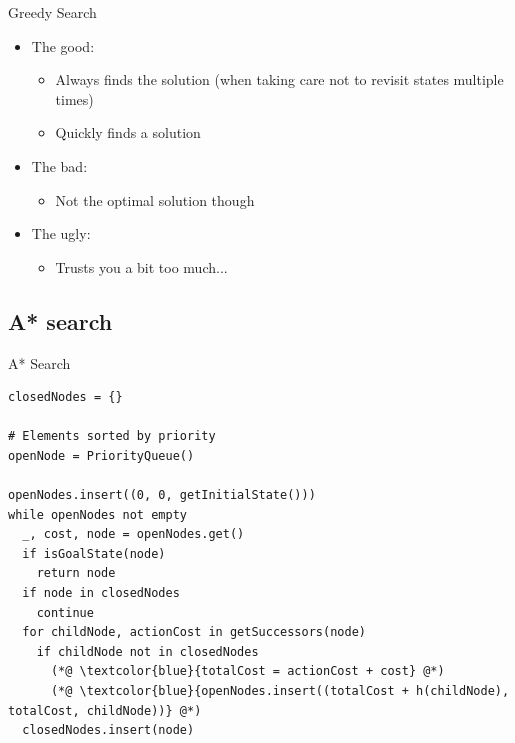 \documentclass{beamer}
\begin{document}
\begin{frame}{Greedy Search}
	\begin{itemize}
		\item The good:
			\pause
			\begin{itemize}
				\item Always finds the solution (when taking care not to revisit states multiple times)
				\item Quickly finds a solution
			\end{itemize}
		\pause
		\item The bad:
			\pause
			\begin{itemize}
				\item Not the optimal solution though
			\end{itemize}
		\pause
		\item The ugly:
			\pause
			\begin{itemize}
				\item Trusts you a bit too much...
			\end{itemize}
	\end{itemize}				
\end{frame}

\subsection{A* search}

\begin{frame}[fragile]{A* Search}
	\begin{lstlisting}
closedNodes = {}

# Elements sorted by priority
openNode = PriorityQueue()

openNodes.insert((0, 0, getInitialState()))
while openNodes not empty 
  _, cost, node = openNodes.get()
  if isGoalState(node)
    return node
  if node in closedNodes
    continue			
  for childNode, actionCost in getSuccessors(node)
    if childNode not in closedNodes
      (*@ \textcolor{blue}{totalCost = actionCost + cost} @*)
      (*@ \textcolor{blue}{openNodes.insert((totalCost + h(childNode), totalCost, childNode))} @*)
  closedNodes.insert(node)
	\end{lstlisting}
\end{frame}
\end{document}
